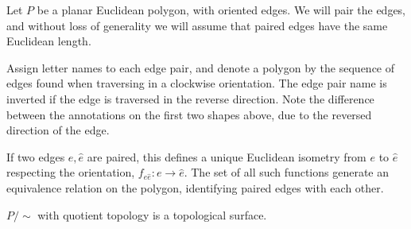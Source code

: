 \documentclass[a4paper]{article}
\begin{document}
\begin{example}
	Let \( P \) be a planar Euclidean polygon, with oriented edges.
	We will pair the edges, and without loss of generality we will assume that paired edges have the same Euclidean length.
	\begin{center}
	\end{center}
	Assign letter names to each edge pair, and denote a polygon by the sequence of edges found when traversing in a clockwise orientation.
	The edge pair name is inverted if the edge is traversed in the reverse direction.
	Note the difference between the annotations on the first two shapes above, due to the reversed direction of the edge.

	If two edges \( e, \hat e \) are paired, this defines a unique Euclidean isometry from \( e \) to \( \hat e \) respecting the orientation, \( f_{e\hat e} \colon e \to \hat e \).
	The set of all such functions generate an equivalence relation on the polygon, identifying paired edges with each other.
	\begin{lemma}
		$P/\sim $ with quotient topology is a topological surface. 
	\end{lemma}
\end{example}
\end{document}
